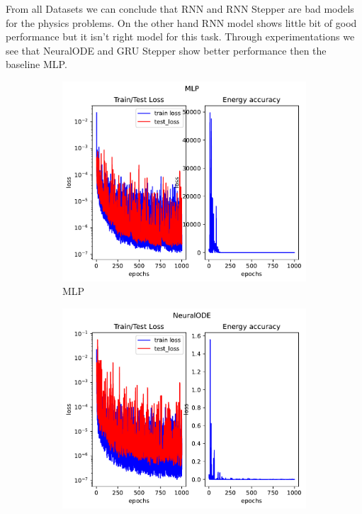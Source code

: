 From all Datasets we can conclude that RNN and RNN Stepper are bad models for the physics problems. On the other hand RNN model shows little bit of good performance but it isn't right model for this task. Through experimentations we see that NeuralODE and GRU Stepper show better performance then the baseline MLP.
\begin{figure}[H]
	\centering
	\begin{subfigure}[b]{0.3\textwidth}
		\centering
		\includegraphics[width=\textwidth]{chapters/chapter5/body3_mlp_loss.pdf}
		\caption{MLP}
	\end{subfigure}
	\hfill
	\begin{subfigure}[b]{0.3\textwidth}
		\centering
		\includegraphics[width=\textwidth]{chapters/chapter5/body3_ode_loss.pdf}

\end{subfigure}
\end{figure}
